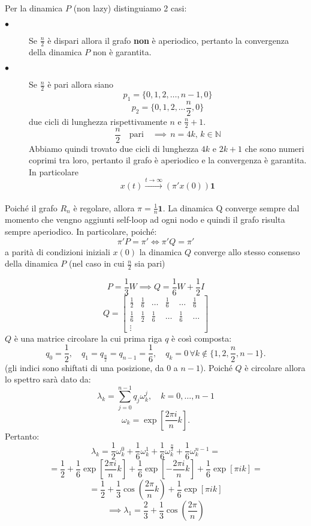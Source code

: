 \begin{alphaparts}
   \questionpart
   Per la dinamica \(P\) (non lazy) distinguiamo 2 casi:
   \begin{description}
       \item[\(\bullet\)] Se \(\frac{n}{2}\) è dispari allora il grafo \textbf{non} è aperiodico, pertanto la convergenza della dinamica \(P\) non è garantita.
       \item[\(\bullet\)] Se \(\frac{n}{2}\) è pari allora siano 
       \[p_1 = \{0,1,2, \dots ,n - 1, 0\}\] 
       \[p_2 = \{0,1,2, \dots \frac{n}{2}, 0\}\]
       due cicli di lunghezza rispettivamente \(n\) e \(\frac{n}{2} + 1\).
       \[\frac{n}{2}  \quad \text{pari} \quad \implies\, n= 4k,\,k\in \mathbb{N}\]
       Abbiamo quindi trovato due cicli di lunghezza \(4k\) e \(2k + 1\) che sono numeri coprimi tra loro, pertanto il grafo è aperiodico e la convergenza è garantita. In particolare
       \[x(t) \xrightarrow[]{t \to \infty} (\pi 'x(0)) \mathbf{1}\]
   \end{description} 
   Poiché il grafo \(R_n\) è regolare, allora \(\pi = \frac{1}{n} \mathbf{1}\). La dinamica Q converge sempre dal momento che vengno aggiunti self-loop ad ogni nodo e quindi il grafo risulta sempre aperiodico. In particolare, poiché:
   \[\pi' P = \pi' \iff \pi'Q = \pi'\]
   a parità di condizioni iniziali \(x(0)\) la dinamica \(Q\) converge allo stesso consenso della dinamica \(P\) (nel caso in cui \(\frac{n}{2}\) sia pari)

   \questionpart %
   \[P = \frac{1}{3} W \implies Q = \frac{1}{6}W + \frac{1}{2}I\]
   \[Q = \begin{bmatrix}
       \frac{1}{2} & \frac{1}{6} & \dots & \frac{1}{6} & \dots & \frac{1}{6} \\
       \frac{1}{6} & \frac{1}{2} & \frac{1}{6} & \dots & \frac{1}{6} & \dots \\
       \vdots 
   \end{bmatrix}\]
   \(Q\) è una matrice circolare la cui prima riga \(q\) è così composta:
   \[q_0 = \frac{1}{2},\quad q_1 = q_{\frac{n}{2}} = q_{n - 1} = \frac{1}{6}, \quad q_k = 0\,  \forall k\notin \{1, 2, \frac{n}{2}, n - 1\}.\]
   (gli indici sono shiftati di una posizione, da \(0\) a \(n - 1\)).
   Poiché \(Q\) è circolare allora lo spettro sarà dato da:
   \[\lambda_k =  \sum \limits_{j = 0}^{n - 1} q_j \omega_k^j,\quad k = 0, \dots , n - 1\]
   \[\omega_k = \exp\left[{\frac{2 \pi i }{n}k}\right].\]
   Pertanto:
   \[ \lambda_k = \frac{1}{2} \omega_k^0 + \frac{1}{6}\omega_k^1 + \frac{1}{6}\omega_k^{\frac{n}{2}} + \frac{1}{6} \omega_k^{n - 1} =
    \]
    \[ = \frac{1}{2} + \frac{1}{6}\exp \left[ \frac{2 \pi i }{n}k\right] + \frac{1}{6}\exp \left[ -\frac{2 \pi i }{n}k\right] + \frac{1}{6}\exp \left[ \pi i k\right] =\]
    \[ = \frac{1}{2} + \frac{1}{3} \cos \left(\frac{2 \pi}{n}k\right) + \frac{1}{6}\exp \left[ \pi i k\right]\]
    \[ \implies \lambda_1 = \frac{2}{3} + \frac{1}{3}\cos\left(\frac{2 \pi}{n}\right)\]
    \end{alphaparts}
